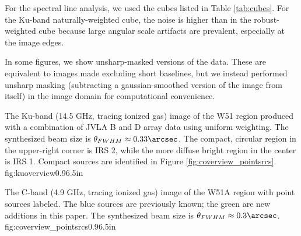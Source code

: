 For the spectral line analysis, we used the cubes listed in Table
\ref{tab:cubes}.  For the Ku-band naturally-weighted cube, the noise is higher
than in the robust-weighted cube because large angular scale artifacts are
prevalent, especially at the image edges.

In some figures, we show unsharp-masked versions of the data.  These are
equivalent to images made excluding short baselines, but we instead performed
unsharp masking (subtracting a gaussian-smoothed version of the image from
itself) in the image domain for computational convenience.



{The Ku-band (14.5 GHz, tracing ionized gas) image of the W51 region produced
with a combination of JVLA B and D array data using uniform weighting.  The
synthesized beam size is
$\theta_{FWHM}\approx0.33\arcsec$.
The compact, circular region in the upper-right corner is IRS 2, while the more
diffuse bright region in the center is IRS 1.  Compact sources are identified
in Figure \ref{fig:coverview_pointsrcs}.
}
{fig:kuoverview}{0.9}{6.5in}

{The C-band (4.9 GHz, tracing ionized gas) image of the W51A region with point sources labeled.  The
blue sources are previously known; the green are new additions in this paper.
The synthesized beam size is $\theta_{FWHM}\approx0.3\arcsec$.
}
{fig:coverview_pointsrcs}{0.9}{6.5in}


